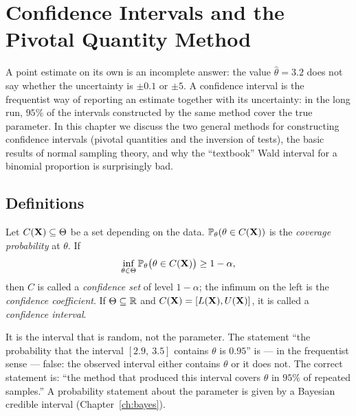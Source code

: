 \documentclass[main.tex]{subfiles}
\begin{document}
\chapter{Confidence Intervals and the Pivotal Quantity Method}\label{ch:guven}

A point estimate on its own is an incomplete answer: the value $\hat\theta=3.2$ does not say whether the uncertainty is $\pm0.1$ or $\pm5$. A confidence interval is the frequentist way of reporting an estimate together with its uncertainty: in the long run, $95\%$ of the intervals constructed by the same method cover the true parameter. In this chapter we discuss the two general methods for constructing confidence intervals (pivotal quantities and the inversion of tests), the basic results of normal sampling theory, and why the ``textbook'' Wald interval for a binomial proportion is surprisingly bad.

\section{Definitions}

\begin{definition}
Let $C(\mathbf{X})\subseteq\Theta$ be a set depending on the data. $\mathbb{P}_\theta(\theta\in C(\mathbf{X}))$ is the \emph{coverage probability} at $\theta$. If
\[
\inf_{\theta\in\Theta}\mathbb{P}_\theta\big(\theta\in C(\mathbf{X})\big)\ge1-\alpha ,
\]
then $C$ is called a \emph{confidence set} of level $1-\alpha$; the infimum on the left is the \emph{confidence coefficient}. If $\Theta\subseteq\mathbb{R}$ and $C(\mathbf{X})=[L(\mathbf{X}),U(\mathbf{X})]$, it is called a \emph{confidence interval}.
\end{definition}

\begin{remark}\label{rem:dogru-yorum}
It is the interval that is random, not the parameter. The statement ``the probability that the interval $[2.9,\ 3.5]$ contains $\theta$ is $0.95$'' is --- in the frequentist sense --- false: the observed interval either contains $\theta$ or it does not. The correct statement is: ``the method that produced this interval covers $\theta$ in $95\%$ of repeated samples.'' A probability statement about the parameter is given by a Bayesian credible interval (Chapter~\ref{ch:bayes}).
\end{remark}
\end{document}
